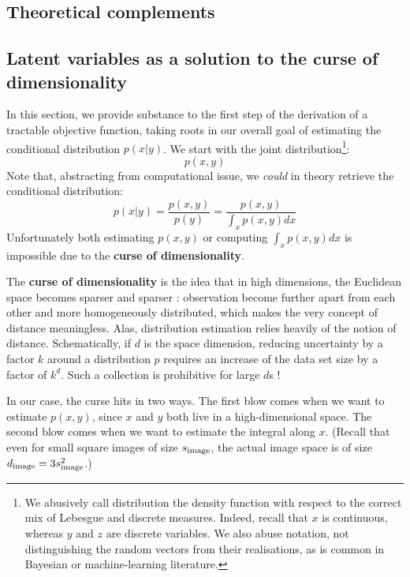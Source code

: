 \documentclass{article}
\begin{document}
{}
\begin{appendix}

\section{Theoretical complements}

\begin{multicols}{2}

\subsection{Latent variables as a solution to the curse of dimensionality} \label{app:latent}

In this section, we provide substance to the first step of the derivation of a tractable objective function, taking roots in our overall goal of estimating the conditional distribution $p(x|y)$. We start with the joint distribution\footnote{We abusively call distribution the density function with respect to the correct mix of Lebesgue and discrete measures. Indeed, recall that $x$ is continuous, whereas $y$ and $z$ are discrete variables. We also abuse notation, not distinguishing the random vectors from their realisations, as is common in Bayesian or machine-learning literature.}: $$p(x,y)$$
Note that, abstracting from computational issue, we \textit{could} in theory retrieve the conditional distribution: $$p(x|y)=\frac{p(x,y)}{p(y)}=\frac{p(x,y)}{\int_x p(x,y)dx} $$
Unfortunately both estimating $p(x,y)$ or computing $\int_x p(x,y)dx$ is impossible due to the \textbf{curse of dimensionality}.

The \textbf{curse of dimensionality} is the idea that in high dimensions, the Euclidean space becomes sparser and sparser : observation become further apart from each other and more homogeneously distributed, which makes the very concept of distance meaningless. Alas, distribution estimation relies heavily of the notion of distance. Schematically, if $d$ is the space dimension, reducing uncertainty by a factor $k$ around a distribution $p$ requires an increase of the data set size by a factor of $k^d$. Such a collection is prohibitive for large $d$s !

In our case, the curse hits in two ways. The first blow comes when we want to estimate $p(x,y)$, since $x$ and $y$ both live in a high-dimensional space. The second blow comes when we want to estimate the integral along $x$. (Recall that even for small square images of size $s_{\mathrm{image}}$, the actual image space is of size $d_{\mathrm{image}}=3s_{\mathrm{image}}^2$.)


\end{multicols}
\end{appendix}
\end{document}
